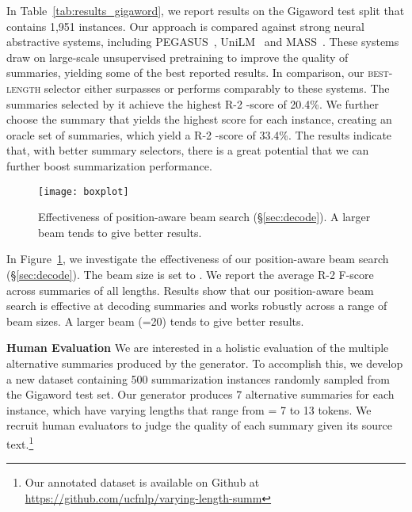 \documentclass[11pt]{article}
\begin{document}
In Table~\ref{tab:results_gigaword}, we report results on the Gigaword test split that contains 1,951 instances.
Our approach is compared against strong neural abstractive systems, including PEGASUS~\cite{zhang2020pegasus}, UniLM~\cite{NIPS2019_9464} and MASS~\cite{song2019mass}.
These systems draw on large-scale unsupervised pretraining to improve the quality of summaries, yielding some of the best reported results.
In comparison, our \textsc{best-length} selector either surpasses or performs comparably to these systems. 
The summaries selected by it achieve the highest R-2 -score of 20.4\%.
We further choose the summary that yields the highest score for each instance, creating an oracle set of summaries, which yield a R-2 -score of 33.4\%.
The results indicate that, with better summary selectors, there is a great potential that we can further boost summarization performance.


\begin{figure}[t]
\centering
\texttt{[image: boxplot]}
\vspace{-0.05in}
\caption{Effectiveness of position-aware beam search (\S\ref{sec:decode}). 
A larger beam tends to give better results.}
\label{fig:beam}
\vspace{-0.15in}
\end{figure}


In Figure~\ref{fig:beam}, we investigate the effectiveness of our position-aware beam search (\S\ref{sec:decode}).
The beam size  is set to .
We report the average R-2 F-score across summaries of all lengths.
Results show that our position-aware beam search is effective at decoding summaries and works robustly across a range of beam sizes. 
A larger beam (=20) tends to give better results.


\vspace{0.08in}
\noindent\textbf{Human Evaluation}\quad
We are interested in a holistic evaluation of the multiple alternative summaries produced by the generator.
To accomplish this, we develop a new dataset containing 500 summarization instances randomly sampled from the Gigaword test set.
Our generator produces 7 alternative summaries for each instance, which have varying lengths that range from = 7 to 13 tokens.
We recruit human evaluators to judge the quality of each summary given its source text.\footnote{Our annotated dataset is available on Github at \url{https://github.com/ucfnlp/varying-length-summ}}
\end{document}
